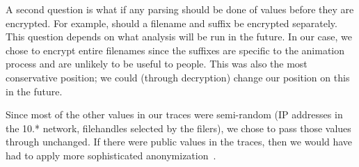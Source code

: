 A second question is what if any parsing should be done of values
before they are encrypted.  For example, should a filename and suffix
be encrypted separately.  This question depends on what analysis will
be run in the future.  In our case, we chose to encrypt entire
filenames since the suffixes are specific to the animation process and
are unlikely to be useful to people.  This was also the most
conservative position; we could (through decryption) change our
position on this in the future.

Since most of the other values in our traces were semi-random (IP
addresses in the 10.* network, filehandles selected by the filers), we
chose to pass those values through unchanged.  If there were public
values in the traces, then we would have had to apply more
sophisticated anonymization~\cite{ruoming07anonymization}.



